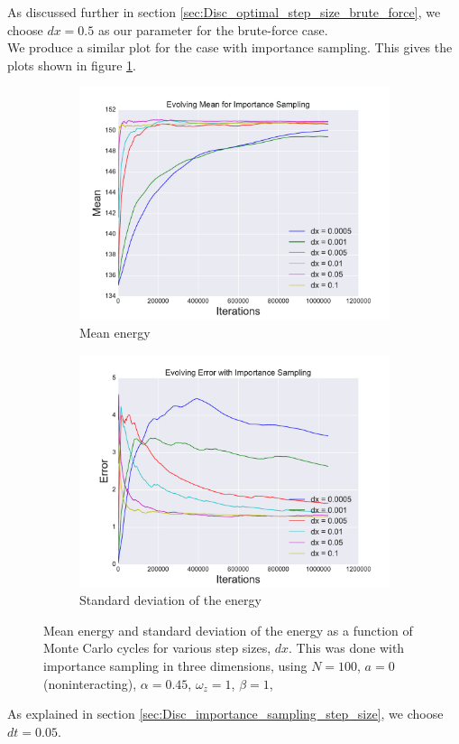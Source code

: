 \documentclass[a4paper, 10pt]{article}
\begin{document}
	As discussed further in section \ref{sec:Disc_optimal_step_size_brute_force}, we choose $dx=0.5$ as our parameter for the brute-force case.\\
	\linebreak
	We produce a similar plot for the case with importance sampling. This gives the plots shown in figure \ref{fig:find_dx_importance}.
		\begin{figure}[ht!]
			\centering
			\centering
			\begin{subfigure}{.5\textwidth}
				\centering
				\includegraphics[width=.8\linewidth]{../Results/EvoMeanIS.pdf}
				\caption{Mean energy}
			\end{subfigure}%
			\begin{subfigure}{.5\textwidth}
				\centering
				\includegraphics[width=.8\linewidth]{../Results/EvoStdIS.pdf}
				\caption{Standard deviation of the energy}
			\end{subfigure}
			\caption{Mean energy and standard deviation of the energy as a function of Monte Carlo cycles for various step sizes, $dx$. This was done with importance sampling in three dimensions, using $N=100$, $a=0$ (noninteracting), $\alpha=0.45$, $\omega_z=1$, $\beta=1$,}\label{fig:find_dx_importance}
		\end{figure}
	As explained in section \ref{sec:Disc_importance_sampling_step_size}, we choose $dt=0.05$.
\end{document}
